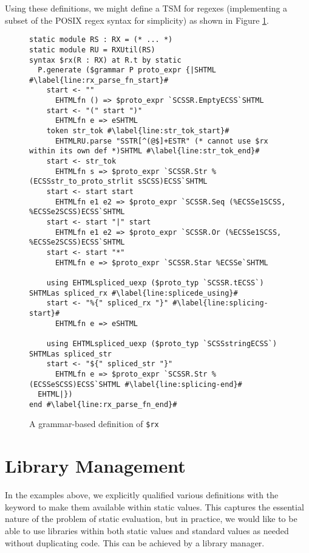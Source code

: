 {Using these definitions, we might define a TSM for regexes (implementing a subset of the POSIX regex syntax for simplicity) as shown in Figure \ref{fig:rx-grammar-based}.

\begin{figure}[h!]
\vspace{-5px}
\begin{lstlisting}[deletekeywords={as}]
static module RS : RX = (* ... *)
static module RU = RXUtil(RS)
syntax $rx(R : RX) at R.t by static 
  P.generate ($grammar P proto_expr {|SHTML #\label{line:rx_parse_fn_start}#
    start <- ""
      EHTMLfn () => $proto_expr `SCSSR.EmptyECSS`SHTML
    start <- "(" start ")"
      EHTMLfn e => eSHTML
    token str_tok #\label{line:str_tok_start}#
      EHTMLRU.parse "SSTR[^(@$]+ESTR" (* cannot use $rx within its own def *)SHTML #\label{line:str_tok_end}#
    start <- str_tok
      EHTMLfn s => $proto_expr `SCSSR.Str %(ECSSstr_to_proto_strlit sSCSS)ECSS`SHTML
    start <- start start
      EHTMLfn e1 e2 => $proto_expr `SCSSR.Seq (%ECSSe1SCSS, %ECSSe2SCSS)ECSS`SHTML
    start <- start "|" start 
      EHTMLfn e1 e2 => $proto_expr `SCSSR.Or (%ECSSe1SCSS, %ECSSe2SCSS)ECSS`SHTML
    start <- start "*"
      EHTMLfn e => $proto_expr `SCSSR.Star %ECSSe`SHTML

    using EHTMLspliced_uexp ($proto_typ `SCSSR.tECSS`) SHTMLas spliced_rx #\label{line:splicede_using}#
    start <- "%{" spliced_rx "}" #\label{line:splicing-start}#
      EHTMLfn e => eSHTML

    using EHTMLspliced_uexp ($proto_typ `SCSSstringECSS`) SHTMLas spliced_str
    start <- "${" spliced_str "}"
      EHTMLfn e => $proto_expr `SCSSR.Str %(ECSSeSCSS)ECSS`SHTML #\label{line:splicing-end}#
  EHTML|})
end #\label{line:rx_parse_fn_end}#
\end{lstlisting}
\vspace{-12px}
\caption{A grammar-based definition of \texttt{\$rx}}
\vspace{-15px}
\label{fig:rx-grammar-based}
\end{figure}


\section{Library Management}
In the examples above, we explicitly qualified various definitions with the  keyword to make them available within static values. This captures the essential nature of the problem of static evaluation, but in practice, we would like to be able to use libraries within both static values and standard values as needed without duplicating code. This can be achieved by a library manager.

}
